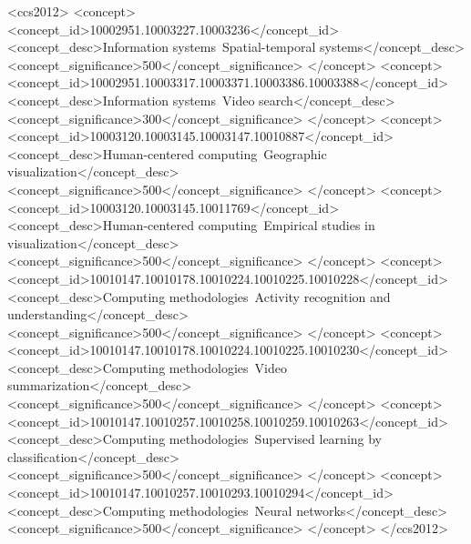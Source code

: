 \documentclass[sigconf]{acmart}
\begin{document}
	\begin{CCSXML}
		<ccs2012>
		<concept>
		<concept_id>10002951.10003227.10003236</concept_id>
		<concept_desc>Information systems~Spatial-temporal systems</concept_desc>
		<concept_significance>500</concept_significance>
		</concept>
		<concept>
		<concept_id>10002951.10003317.10003371.10003386.10003388</concept_id>
		<concept_desc>Information systems~Video search</concept_desc>
		<concept_significance>300</concept_significance>
		</concept>
		<concept>
		<concept_id>10003120.10003145.10003147.10010887</concept_id>
		<concept_desc>Human-centered computing~Geographic visualization</concept_desc>
		<concept_significance>500</concept_significance>
		</concept>
		<concept>
		<concept_id>10003120.10003145.10011769</concept_id>
		<concept_desc>Human-centered computing~Empirical studies in visualization</concept_desc>
		<concept_significance>500</concept_significance>
		</concept>
		<concept>
		<concept_id>10010147.10010178.10010224.10010225.10010228</concept_id>
		<concept_desc>Computing methodologies~Activity recognition and understanding</concept_desc>
		<concept_significance>500</concept_significance>
		</concept>
		<concept>
		<concept_id>10010147.10010178.10010224.10010225.10010230</concept_id>
		<concept_desc>Computing methodologies~Video summarization</concept_desc>
		<concept_significance>500</concept_significance>
		</concept>
		<concept>
		<concept_id>10010147.10010257.10010258.10010259.10010263</concept_id>
		<concept_desc>Computing methodologies~Supervised learning by classification</concept_desc>
		<concept_significance>500</concept_significance>
		</concept>
		<concept>
		<concept_id>10010147.10010257.10010293.10010294</concept_id>
		<concept_desc>Computing methodologies~Neural networks</concept_desc>
		<concept_significance>500</concept_significance>
		</concept>
		</ccs2012>
	\end{CCSXML}
	
	
	
\end{document}
